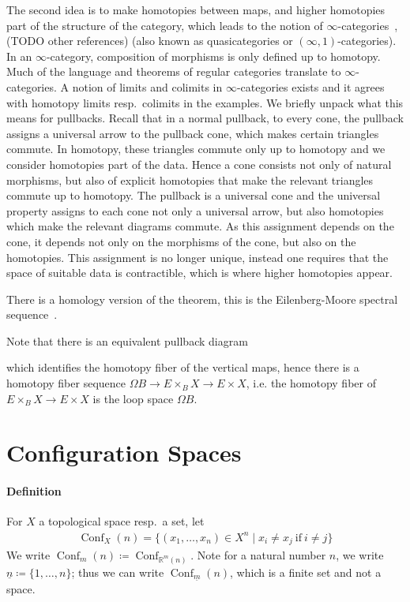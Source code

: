 \documentclass{scrartcl}
\theoremstyle{plain}
\theoremstyle{definition}
\newcommand{\R}{\mathbb R}
\newcommand{\defeq}{\coloneqq}
\DeclareMathOperator{\Conf}{Conf}
\begin{document}
The second idea is to make homotopies between maps, and higher homotopies part of the structure of the category, which leads to the notion of $\infty$-categories~\cite{lurie2009higher},\ \cite{lurie2017higher} (TODO other references) (also known as quasicategories or $(\infty, 1)$-categories). In an $\infty$-category, composition of morphisms is only defined up to homotopy. Much of the language and theorems of regular categories translate to $\infty$-categories. A notion of limits and colimits in $\infty$-categories exists and it agrees with homotopy limits resp.~colimits in the examples. We briefly unpack what this means for pullbacks. Recall that in a normal pullback, to every cone, the pullback assigns a universal arrow to the pullback cone, which makes certain triangles commute. In homotopy, these triangles commute only up to homotopy and we consider homotopies part of the data. Hence a cone consists not only of natural morphisms, but also of explicit homotopies that make the relevant triangles commute up to homotopy. The pullback is a universal cone and the universal property assigns to each cone not only a universal arrow, but also homotopies which make the relevant diagrams commute. As this assignment depends on the cone, it depends not only on the morphisms of the cone, but also on the homotopies. This assignment is no longer unique, instead one requires that the space of suitable data is contractible, which is where higher homotopies appear. 

There is a homology version of the theorem, this is the Eilenberg-Moore spectral sequence~\cite{eilenberg1966homology}. 

Note that there is an equivalent pullback diagram
\begin{center}
\end{center}
which identifies the homotopy fiber of the vertical maps, hence there is a homotopy fiber sequence $\Omega B \to E\times_B X \to E\times X$, i.e. the homotopy fiber of $E\times_B X \to E\times X$ is the loop space $\Omega B$.


\section{Configuration Spaces}

\paragraph{Definition} For $X$ a topological space resp.\ a set, let
\begin{align*}
    \Conf_X(n) = \{(x_1,\dots, x_n)\in X^n \mid x_i \neq x_j\ \text{if}\ i\neq j\}
\end{align*}
We write $\Conf_m(n) \coloneqq \Conf_{\R^m(n)}$. Note for a natural number $n$, we write $\underline n \defeq \{1, \dots, n\}$; thus we can write $\Conf_{\underline m}(n)$, which is a finite set and not a space. 
\end{document}
